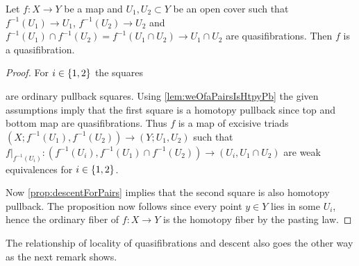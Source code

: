 \begin{corollary}\label{cor:locOfQuasifib}
    Let $f\colon X\to Y$ be a map and $U_1, U_2\subset Y$ be an open cover such that $f^{-1}(U_1)\to U_1$, $f^{-1}(U_2)\to U_2$ and $f^{-1}(U_1)\cap f^{-1}(U_2)=f^{-1}(U_1\cap U_2)\to U_1\cap U_2$ are quasifibrations.
    Then $f$ is a quasifibration.
    \begin{proof}
        For $i\in\left\lbrace1,2\right\rbrace$ the squares 
        \begin{center}
        \end{center} 
        are ordinary pullback squares.
        Using \cref{lem:weOfaPairsIsHtpyPb} the given assumptions imply that the first square is a homotopy pullback since top and bottom map are quasifibrations.
        Thus $f$ is a map of excisive triads $(X;f^{-1}(U_1),f^{-1}(U_2))\to(Y;U_1,U_2)$ such that $f|_{f^{-1}(U_i)}\colon(f^{-1}(U_i),f^{-1}(U_1)\cap f^{-1}(U_2))\to (U_i,U_1\cap U_2)$ are weak equivalences for $i\in\left\lbrace1,2\right\rbrace$.

        Now \cref{prop:descentForPairs} implies that the second square is also homotopy pullback.
        The proposition now follows since every point $y\in Y$ lies in some $U_i$, hence the ordinary fiber of $f\colon X\to Y$ is the homotopy fiber by the pasting law.
    \end{proof}
\end{corollary}
The relationship of locality of quasifibrations and descent also goes the other way as the next remark shows.
